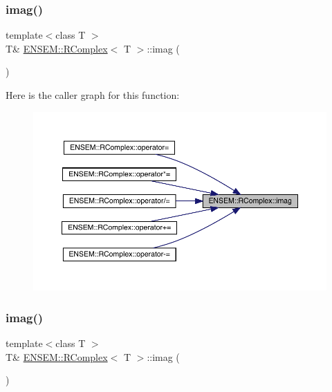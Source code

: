 \subsubsection{\texorpdfstring{imag()}{imag()}\hspace{0.1cm}{\footnotesize\ttfamily [1/6]}}
{\footnotesize\ttfamily template$<$class T $>$ \\
T\& \mbox{\hyperlink{classENSEM_1_1RComplex}{E\+N\+S\+E\+M\+::\+R\+Complex}}$<$ T $>$\+::imag (\begin{DoxyParamCaption}{ }\end{DoxyParamCaption})\hspace{0.3cm}{\ttfamily [inline]}}

Here is the caller graph for this function\+:
\nopagebreak
\begin{figure}[H]
\begin{center}
\leavevmode
\includegraphics[width=350pt]{d9/d0e/classENSEM_1_1RComplex_af4f97cf18c025407a8e66f848252243d_icgraph}
\end{center}
\end{figure}
\mbox{\label{classENSEM_1_1RComplex_af4f97cf18c025407a8e66f848252243d}} 
\subsubsection{\texorpdfstring{imag()}{imag()}\hspace{0.1cm}{\footnotesize\ttfamily [2/6]}}
{\footnotesize\ttfamily template$<$class T $>$ \\
T\& \mbox{\hyperlink{classENSEM_1_1RComplex}{E\+N\+S\+E\+M\+::\+R\+Complex}}$<$ T $>$\+::imag (\begin{DoxyParamCaption}{ }\end{DoxyParamCaption})\hspace{0.3cm}{\ttfamily [inline]}}

